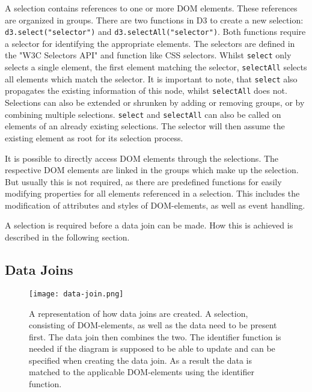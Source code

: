 A selection contains references to one or more DOM elements. These references are organized in groups. There are two functions in D3 to create a new selection: \verb|d3.select("selector")| and \verb|d3.selectAll("selector")|. Both functions require a selector for identifying the appropriate elements. The selectors are defined in the "W3C Selectors API" \cite{w3c_selectors_api} and function like CSS selectors. Whilst \verb|select| only selects a single element, the first element matching the selector, \verb|selectAll| selects all elements which match the selector. It is important to note, that \verb|select| also propagates the existing information of this node, whilst \verb|selectAll| does not. Selections can also be extended or shrunken by adding or removing groups, or by combining multiple selections. \verb|select| and \verb|selectAll| can also be called on elements of an already existing selections. The selector will then assume the existing element as root for its selection process.

It is possible to directly access DOM elements through the selections. The respective DOM elements are linked in the groups which make up the selection. But usually this is not required, as there are predefined functions for easily modifying properties for all elements referenced in a selection. This includes the modification of attributes and styles of DOM-elements, as well as event handling.

A selection is required before a data join can be made. How this is achieved is described in the following section.


\subsection{Data Joins}

\begin{figure}[ht]
    \texttt{[image: data-join.png]}
    \captionsetup{width=0.9\textwidth}
    \caption[data-joins]{A representation of how data joins are created. A selection, consisting of DOM-elements, as well as the data need to be present first. The data join then combines the two. The identifier function is needed if the diagram is supposed to be able to update and can be specified when creating the data join. As a result the data is matched to the applicable DOM-elements using the identifier function.}
    \label{fig:data-joins}
\end{figure}

